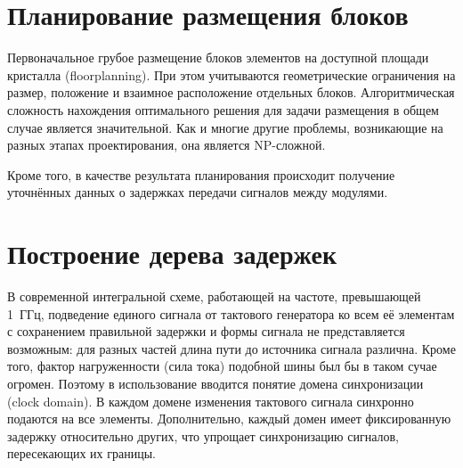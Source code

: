 \section{Планирование размещения блоков}

Первоначальное грубое размещение блоков элементов на доступной площади кристалла (\abbr floorplanning). При этом учитываются геометрические ограничения на размер, положение и взаимное расположение отдельных блоков. Алгоритмическая сложность нахождения оптимального решения для задачи размещения в общем случае является значительной. Как и многие другие проблемы, возникающие на разных этапах проектирования, она является NP-сложной.

Кроме того, в качестве результата планирования происходит получение уточнённых данных о задержках передачи сигналов между модулями. 



% 

\section{Построение дерева задержек}

В современной интегральной схеме, работающей на частоте, превышающей 1~ГГц, подведение единого сигнала от тактового генератора ко всем её элементам с сохранением правильной задержки и формы сигнала не представляется возможным: для разных частей длина пути до источника сигнала различна. Кроме того, фактор нагруженности (сила тока) подобной шины был бы в таком сучае огромен. Поэтому в использование вводится понятие домена синхронизации (\abbr clock domain). В каждом домене изменения тактового сигнала синхронно подаются на все элементы. Дополнительно, каждый домен имеет фиксированную задержку относительно других, что упрощает синхронизацию сигналов, пересекающих их границы.

